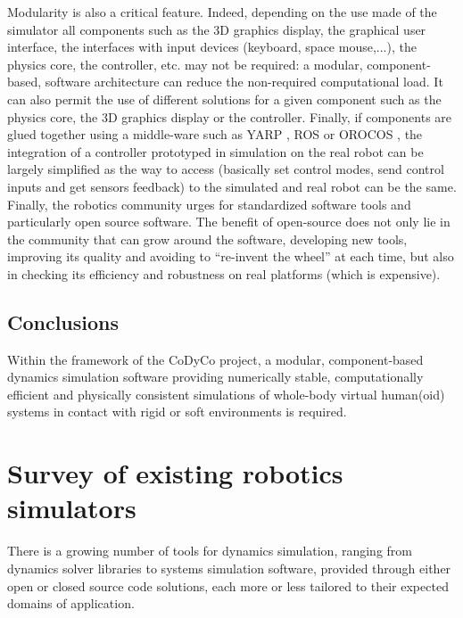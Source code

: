\documentclass[12pt,a4paper,twoside]{article}
\begin{document}
Modularity is also a critical feature. Indeed, depending on the use made of the simulator all components such as the 3D graphics display, the graphical user interface, the interfaces with input devices (keyboard, space mouse,...), the physics core, the controller, etc. may not be required: a modular, component-based, software architecture can reduce the non-required computational load. It can also permit the use of different solutions for a given component such as the physics core, the 3D graphics display or the controller. Finally, if components are glued together using a middle-ware such as YARP \cite{metta2006yarp}, ROS \cite{quigley2009ros} or OROCOS \cite{bruyninckx-icra2003}, the integration of a controller prototyped in simulation on the real robot can be largely simplified as the way to access (basically set control modes, send control inputs and get sensors feedback) to the simulated and real robot can be the same.\\

Finally, the robotics community urges for standardized software tools and particularly open source software. The benefit of open-source does not only lie in the community that can grow around the software, developing new tools, improving its quality and avoiding to ``re-invent the wheel'' at each time, but also in checking its efficiency and robustness on real platforms (which is expensive).

\subsection{Conclusions}

Within the framework of the CoDyCo project, a modular, component-based dynamics simulation software providing numerically stable, computationally efficient and physically consistent simulations of whole-body virtual human(oid) systems in contact with rigid or soft environments is required. 

\section{Survey of existing robotics simulators}
\label{sec:survey}

There is a growing number of tools for dynamics simulation, ranging from dynamics solver libraries to systems simulation software, provided through either open or closed source code solutions, each more or less tailored to their expected domains of application.\\
\end{document}
